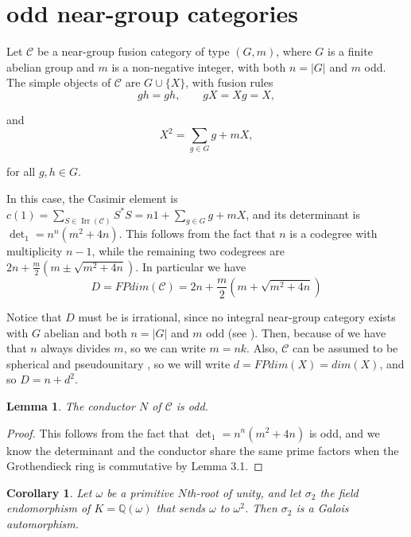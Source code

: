\documentclass[a4paper,twoside,11pt]{amsart}
\newtheorem*{remark}{Remark}
\newtheorem{lemma}[theorem]{Lemma}
\newtheorem{corollary}[theorem]{Corollary}
\theoremstyle{plain} %
\theoremstyle{definition}
\begin{document}

\section{odd near-group categories}

Let \(\mathcal{C}\) be a near-group fusion category of type \((G,m)\), where \(G\) is a finite abelian group and \(m\) is a non-negative integer, with both $
n=|G|$ and $m$ odd. The simple objects of \(\mathcal{C}\) are \(G\cup\{X\}\), with fusion rules
\[
gh=gh,\qquad gX=Xg=X,
\]

and
\[
X^2=\sum_{g\in G}g+mX,
\]

for all \(g,h\in G\).
\medskip

 In this case, the Casimir element is $c(1)=\sum_{S\in\operatorname{Irr}(\mathcal{C})}S^*S
=n1+\sum_{g\in G}g+mX$, and its determinant is $\det_1=n^n(m^2+4n)$\cite{WLL}. This follows from the fact that $n$ is a codegree with multiplicity $n-1$, while the remaining two codegrees are $2n+\frac{m}{2}\left(m\pm\sqrt{m^2+4n}\right)$. In particular we have  
\begin{equation}
    D=FPdim(\mathcal{C})=2n+\frac{m}{2}\left(m+\sqrt{m^2+4n}\right)
\end{equation}


\medskip

Notice that $D$ must be is irrational, since no integral near-group category exists with $G$ abelian and both $n=|G|$ and $m$ odd (see \cite[Lemma A.9 and Theorem A.14]{O2}). Then, because of \cite[Proposition 3.3]{Sch} we have that $n$ always divides $m$, so we can write $m=nk$. Also, $\mathcal{C}$ can be assumed to be spherical and pseudounitary \cite{Th}, so we will write $d=FPdim(X)=dim(X)$, and so $D=n+d^2$.
\medskip


\begin{lemma}
    The conductor $N$ of $\mathcal{C}$ is odd.
\end{lemma}
\begin{proof}
    This follows from the fact that $\det_1=n^n(m^2+4n)$ is odd, and we know the determinant and the conductor share the same prime factors when the Grothendieck ring is commutative by Lemma 3.1.
\end{proof}
\begin{corollary}
    Let $\omega$ be a primitive $N$th-root of unity, and let $\sigma_2$ the field endomorphism of $K=\mathbb{Q}(\omega)$ that sends $\omega$ to $\omega^2$. Then $\sigma_2$ is a Galois automorphism.
\end{corollary}
    \medskip
\end{document}
